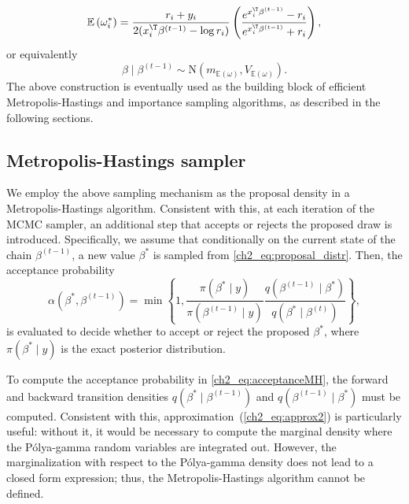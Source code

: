 \begin{equation*}
\mathbb{E}\left(\omega_i^*\right) = \frac{r_i+y_i}{2(x_i^\T\beta^{(t-1)}-\log r_i)}\left(\frac{e^{x_i^\T\beta^{(t-1)}}-r_i}{e^{x_i^\T\beta^{(t-1)}}+r_i}\right),
\end{equation*}
or equivalently
\begin{equation}
\beta\mid \beta^{(t-1)} \sim \mathrm{N}(m_{\mathbb{E}(\omega)}, V_{\mathbb{E}(\omega)}).
\label{ch2_eq:proposal_distr}
\end{equation}
The above construction is eventually used as the building block of efficient Metropolis-Hastings and importance sampling algorithms, as described in the following sections.
%

\subsection{Metropolis-Hastings sampler}
\label{ch2_sec:mh}

We employ the above sampling mechanism as the proposal density in a Metropolis-Hastings algorithm. Consistent with this, at each iteration of the MCMC sampler, an additional step that accepts or rejects the proposed draw is introduced. Specifically, we assume that conditionally on the current state of the chain $\beta^{(t-1)}$, a new value $\beta^*$ is sampled from \eqref{ch2_eq:proposal_distr}. Then, the acceptance probability 
\begin{equation}
\alpha(\beta^*,\beta^{(t-1)}) = \min\left\{ 1, \frac{\pi(\beta^*\mid y)}{\pi(\beta^{(t-1)}\mid y)}\frac{q(\beta^{(t-1)}\mid \beta^*)}{q(\beta^{*}\mid \beta^{(t)})} \right\},
\label{ch2_eq:acceptanceMH}
\end{equation}
is evaluated to decide whether to accept or reject the proposed $\beta^*$, where $\pi(\beta^*\mid y)$ is the exact posterior distribution.

%
To compute the acceptance probability in \eqref{ch2_eq:acceptanceMH}, the forward and backward transition densities $q(\beta^*\mid \beta^{(t-1)})$ and $q(\beta^{(t-1)}\mid \beta^*)$ must be computed. Consistent with this,  approximation~(\ref{ch2_eq:approx2}) is particularly useful: without it, it would be necessary to compute the marginal density where the P\'olya-gamma random variables are integrated out. However, the marginalization with respect to the  P\'olya-gamma density does not lead to a closed form expression; thus, the Metropolis-Hastings algorithm cannot be defined. %
%


